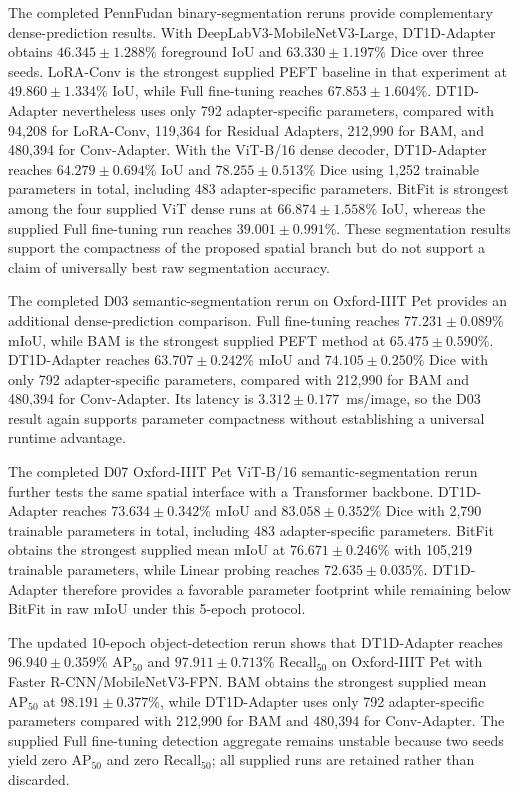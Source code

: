 \documentclass[pdflatex,sn-mathphys-num]{sn-jnl}
\theoremstyle{thmstyleone}
\theoremstyle{thmstyletwo}
\theoremstyle{thmstylethree}
\begin{document}
The completed PennFudan binary-segmentation reruns provide complementary dense-prediction results. With DeepLabV3-MobileNetV3-Large, DT1D-Adapter obtains $46.345\pm1.288\%$ foreground IoU and $63.330\pm1.197\%$ Dice over three seeds. LoRA-Conv is the strongest supplied PEFT baseline in that experiment at $49.860\pm1.334\%$ IoU, while Full fine-tuning reaches $67.853\pm1.604\%$. DT1D-Adapter nevertheless uses only 792 adapter-specific parameters, compared with 94,208 for LoRA-Conv, 119,364 for Residual Adapters, 212,990 for BAM, and 480,394 for Conv-Adapter. With the ViT-B/16 dense decoder, DT1D-Adapter reaches $64.279\pm0.694\%$ IoU and $78.255\pm0.513\%$ Dice using 1,252 trainable parameters in total, including 483 adapter-specific parameters. BitFit is strongest among the four supplied ViT dense runs at $66.874\pm1.558\%$ IoU, whereas the supplied Full fine-tuning run reaches $39.001\pm0.991\%$. These segmentation results support the compactness of the proposed spatial branch but do not support a claim of universally best raw segmentation accuracy.

The completed D03 semantic-segmentation rerun on Oxford-IIIT Pet provides an additional dense-prediction comparison. Full fine-tuning reaches $77.231\pm0.089\%$ mIoU, while BAM is the strongest supplied PEFT method at $65.475\pm0.590\%$. DT1D-Adapter reaches $63.707\pm0.242\%$ mIoU and $74.105\pm0.250\%$ Dice with only 792 adapter-specific parameters, compared with 212,990 for BAM and 480,394 for Conv-Adapter. Its latency is $3.312\pm0.177$~ms/image, so the D03 result again supports parameter compactness without establishing a universal runtime advantage.

The completed D07 Oxford-IIIT Pet ViT-B/16 semantic-segmentation rerun further tests the same spatial interface with a Transformer backbone. DT1D-Adapter reaches $73.634\pm0.342\%$ mIoU and $83.058\pm0.352\%$ Dice with 2,790 trainable parameters in total, including 483 adapter-specific parameters. BitFit obtains the strongest supplied mean mIoU at $76.671\pm0.246\%$ with 105,219 trainable parameters, while Linear probing reaches $72.635\pm0.035\%$. DT1D-Adapter therefore provides a favorable parameter footprint while remaining below BitFit in raw mIoU under this 5-epoch protocol.

The updated 10-epoch object-detection rerun shows that DT1D-Adapter reaches $96.940\pm0.359\%$ $\mathrm{AP}_{50}$ and $97.911\pm0.713\%$ $\mathrm{Recall}_{50}$ on Oxford-IIIT Pet with Faster R-CNN/MobileNetV3-FPN. BAM obtains the strongest supplied mean $\mathrm{AP}_{50}$ at $98.191\pm0.377\%$, while DT1D-Adapter uses only 792 adapter-specific parameters compared with 212,990 for BAM and 480,394 for Conv-Adapter. The supplied Full fine-tuning detection aggregate remains unstable because two seeds yield zero $\mathrm{AP}_{50}$ and zero $\mathrm{Recall}_{50}$; all supplied runs are retained rather than discarded.
\end{document}
